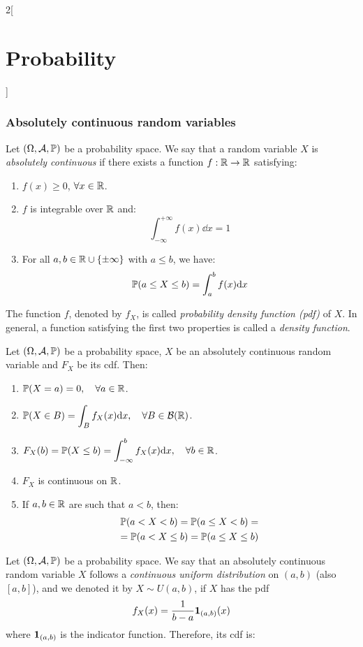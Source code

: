 \documentclass[../../../main.tex]{subfiles}
\begin{document}
\begin{multicols}{2}[\section{Probability}]
  \subsubsection{Absolutely continuous random variables}
  \begin{definition}
    Let $(\Omega,\mathcal{A},\mathbb{P})$ be a probability space. We say that a random variable $X$ is \textit{absolutely continuous} if there exists a function $f:\mathbb{R}\rightarrow\mathbb{R}$ satisfying:
    \begin{enumerate}
      \item $f(x)\geq 0$, $\forall x\in\mathbb{R}$.
      \item $f$ is integrable over $\mathbb{R}$ and: $$\int_{-\infty}^{+\infty}f(x)\dd x=1$$
      \item For all $a,b\in\mathbb{R}\cup\{\pm\infty\}$ with $a\leq b$, we have: $$\mathbb{P}(a\leq X\leq b)=\int_a^bf(x)\dd x$$
    \end{enumerate}
    The function $f$, denoted by $f_X$, is called \textit{probability density function (pdf)} of $X$. In general, a function satisfying the first two properties is called a \textit{density function}.
  \end{definition}
  \begin{prop}
    Let $(\Omega,\mathcal{A},\mathbb{P})$ be a probability space, $X$ be an absolutely continuous random variable and $F_X$ be its cdf. Then:
    \begin{enumerate}
      \item $\mathbb{P}(X=a)=0,\quad\forall a\in \mathbb{R}$.
      \item $\displaystyle \mathbb{P}(X\in B)=\int_Bf_X(x)\dd x,\quad\forall B\in\mathcal{B}(\mathbb{R})$.
      \item $\displaystyle F_X(b)=\mathbb{P}(X\leq b)=\int_{-\infty}^bf_X(x)\dd x,\quad\forall b\in\mathbb{R}$.
      \item $F_X$ is continuous on $\mathbb{R}$.
      \item If $a,b\in\mathbb{R}$ are such that $a<b$, then:
            \begin{multline*}
              \mathbb{P}(a<X<b)=\mathbb{P}(a\leq X<b)=\\=\mathbb{P}(a<X\leq b)=\mathbb{P}(a\leq X\leq b)
            \end{multline*}
    \end{enumerate}
  \end{prop}
  \begin{definition}
    Let $(\Omega,\mathcal{A},\mathbb{P})$ be a probability space. We say that an absolutely continuous random variable $X$ follows a \textit{continuous uniform distribution} on $(a,b)$ (also $[a,b]$), and we denoted it by $X\sim U(a,b)$, if $X$ has the pdf $$f_X(x)=\frac{1}{b-a}\boldsymbol{\mathrm{1}}_{(a,b)}(x)$$ where $\boldsymbol{\mathrm{1}}_{(a,b)}$ is the indicator function. Therefore, its cdf is:

\end{definition}
\end{multicols}
\end{document}
